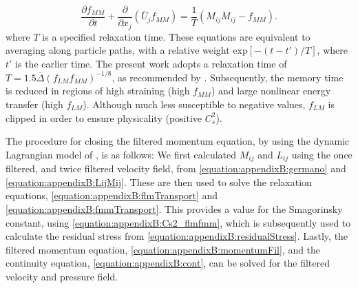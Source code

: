 \documentclass[12pt,oneside,a4paper]{article}
\newcommand{\pdev}[2]{\frac{\partial {#1}}{\partial {#2}}}
\begin{document}
\begin{equation}
\label{equation:appendixB:fmmTransport}
\pdev{f_{MM}}{t} + \pdev{}{x_j}(\overline{U}_j f_{MM}) = \frac{1}{T}(M_{ij}M_{ij} - f_{MM}).
\end{equation}
where $T$ is a specified relaxation time. These equations are equivalent to averaging along particle paths, with a relative weight $\text{exp}[-(t-t')/T]$, where $t'$ is the earlier time.  The present work adopts a relaxation time of $T = 1.5 \overline{\Delta} (f_{LM}f_{MM})^{-1/8}$, as recommended by \cite{meneveau1996}. Subsequently, the memory time is reduced in regions of high straining (high $f_{MM}$) and large nonlinear energy transfer (high $f_{LM}$). Although much less susceptible to negative values, $f_{LM}$ is clipped in order to ensure physicality (positive $C_s^2$). 

The procedure for closing the filtered momentum equation, by using the dynamic Lagrangian model of \cite{meneveau1996}, is as follows: We first calculated $M_{ij}$ and $L_{ij}$ using the once filtered, and twice filtered velocity field, from \eqref{equation:appendixB:germano} and \eqref{equation:appendixB:LijMij}. These are then used to solve the relaxation equations, \eqref{equation:appendixB:flmTransport} and \eqref{equation:appendixB:fmmTransport}. This provides a value for the Smagorinsky constant, using \eqref{equation:appendixB:Cs2_flmfmm}, which is subsequently used to calculate the residual stress from \eqref{equation:appendixB:residualStress}. Lastly, the filtered momentum equation, \eqref{equation:appendixB:momentumFil}, and the continuity equation, \eqref{equation:appendixB:cont}, can be solved for the filtered velocity and pressure field.
\end{document}
